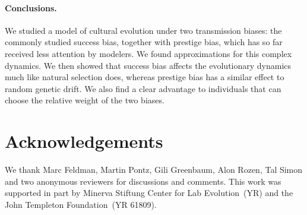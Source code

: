 \documentclass[12pt]{extarticle}
\begin{document}
\paragraph{Conclusions.}
We studied a model of cultural evolution under two transmission biases: the commonly studied success bias, together with prestige bias, which has so far received less attention by modelers. We found approximations for this complex dynamics. We then showed that success bias affects the evolutionary dynamics much like natural selection does, whereas prestige bias has a similar effect to random genetic drift. We also find a clear advantage to individuals that can choose the relative weight of the two biases.

{\small
\section*{Acknowledgements}
We thank Marc Feldman, Martin Pontz, Gili Greenbaum, Alon Rozen, Tal Simon and two anonymous reviewers for discussions and comments.
This work was supported in part by 
Minerva Stiftung Center for Lab Evolution~(YR) and  the John Templeton Foundation~(YR 61809).
}

\newpage 
\end{document}
